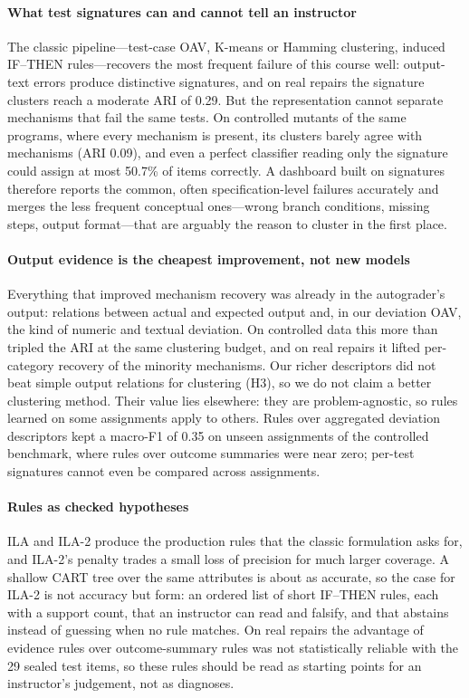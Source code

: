 \documentclass[a4paper,preprint,12pt,authoryear]{elsarticle}
\begin{document}
\paragraph{What test signatures can and cannot tell an instructor}
The classic pipeline---test-case OAV, K-means or Hamming clustering, induced IF--THEN rules---recovers the most frequent failure of this course well: output-text errors produce distinctive signatures, and on real repairs the signature clusters reach a moderate ARI of 0.29. But the representation cannot separate mechanisms that fail the same tests. On controlled mutants of the same programs, where every mechanism is present, its clusters barely agree with mechanisms (ARI 0.09), and even a perfect classifier reading only the signature could assign at most 50.7\% of items correctly. A dashboard built on signatures therefore reports the common, often specification-level failures accurately and merges the less frequent conceptual ones---wrong branch conditions, missing steps, output format---that are arguably the reason to cluster in the first place.

\paragraph{Output evidence is the cheapest improvement, not new models}
Everything that improved mechanism recovery was already in the autograder's output: relations between actual and expected output and, in our deviation OAV, the kind of numeric and textual deviation. On controlled data this more than tripled the ARI at the same clustering budget, and on real repairs it lifted per-category recovery of the minority mechanisms. Our richer descriptors did not beat simple output relations for clustering (H3), so we do not claim a better clustering method. Their value lies elsewhere: they are problem-agnostic, so rules learned on some assignments apply to others. Rules over aggregated deviation descriptors kept a macro-F1 of 0.35 on unseen assignments of the controlled benchmark, where rules over outcome summaries were near zero; per-test signatures cannot even be compared across assignments.

\paragraph{Rules as checked hypotheses}
ILA and ILA-2 produce the production rules that the classic formulation asks for, and ILA-2's penalty trades a small loss of precision for much larger coverage. A shallow CART tree over the same attributes is about as accurate, so the case for ILA-2 is not accuracy but form: an ordered list of short IF--THEN rules, each with a support count, that an instructor can read and falsify, and that abstains instead of guessing when no rule matches. On real repairs the advantage of evidence rules over outcome-summary rules was not statistically reliable with the 29 sealed test items, so these rules should be read as starting points for an instructor's judgement, not as diagnoses.
\end{document}
